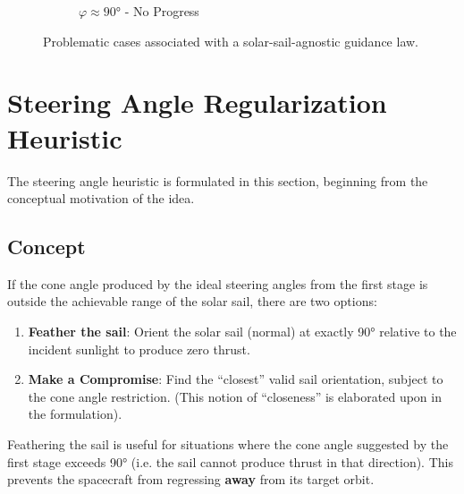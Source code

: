 \begin{figure}[H]
\begin{subfigure}[b]{0.45\textwidth}
        \caption{$\varphi \approx \ang{90}$ - No Progress}
        \label{fig:degencase_2}
    \end{subfigure}
    \caption{Problematic cases associated with a solar-sail-agnostic guidance law.}
    \label{fig:degencases}
\end{figure}

\section{Steering Angle Regularization Heuristic}
The steering angle heuristic is formulated in this section, beginning from the conceptual motivation of the idea.

\subsection{Concept}
If the cone angle produced by the ideal steering angles from the first stage is outside the achievable range of the solar sail, there are two options:
\begin{enumerate}
    \setlength{\parskip}{2pt}
    \item \textbf{Feather the sail}: Orient the solar sail (normal) at exactly \ang{90} relative to the incident sunlight to produce zero thrust.
    \item \textbf{Make a Compromise}: Find the ``closest'' valid sail orientation, subject to the cone angle restriction. (This notion of ``closeness'' is elaborated upon in the formulation).
\end{enumerate}

Feathering the sail is useful for situations where the cone angle suggested by the first stage exceeds \ang{90} (i.e. the sail cannot produce thrust in that direction). This prevents the spacecraft from regressing \textbf{away} from its target orbit.

